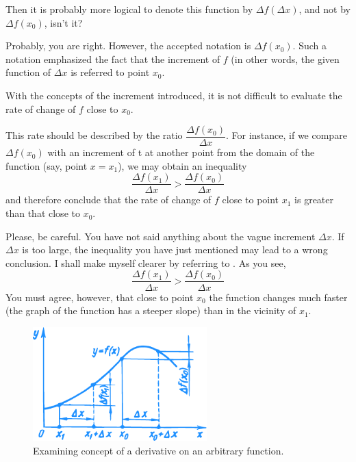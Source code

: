 \rdr Then it is probably more logical to denote this function by $\Delta f (\Delta x)$, and not by $\Delta f (x_{0})$, isn't it?

\athr Probably, you are right. However, the accepted notation is $\Delta f (x_{0})$. Such a notation emphasized the fact that the increment of $f$ (in other words, the given function of $\Delta x$ is referred to point $x_{0}$.

With the concepts of the increment introduced, it is not difficult to evaluate the rate of change of $f$ close to $x_{0}$.


\rdr This rate should be described by the ratio $\dfrac{\Delta f(x_{0})}{\Delta x}$. For instance, if we compare $\Delta f(x_{0})$ with an increment of t at another point from the domain of the function (say, point $x = x_{1}$), we may obtain an inequality
\begin{equation*}%
\frac{\Delta f (x_{1})}{\Delta x} > \frac{\Delta f (x_{0})}{\Delta x} 
\end{equation*}
and therefore conclude that the rate of change of $f$ close to point $x_{1}$ is greater than that close to $x_{0}$.

\athr Please, be careful. You have not said anything about the vague increment $\Delta x$. If $\Delta x$ is too large, the inequality you have just mentioned may lead to a wrong conclusion. I shall make myself clearer by referring to
. As you see,
\begin{equation*}%
\frac{\Delta f (x_{1})}{\Delta x} > \frac{\Delta f (x_{0})}{\Delta x} 
\end{equation*}
You must agree, however, that close to point $x_{0}$ the function changes much faster (the graph of the function has a steeper slope) than in the vicinity of $x_{1}$.

\begin{figure}[!ht]%
\centering
\includegraphics[width=0.6\textwidth]{figures/fig-37.pdf}
\caption{Examining concept of a derivative on an arbitrary function.}
\label{fig-37}
\end{figure}

